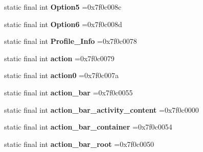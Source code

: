 \begin{DoxyCompactItemize}
\item 
\hypertarget{classcheck_1_1test_1_1_r_1_1id_ae06e762572fe73d9d3e5b03c27039f88}{}static final int {\bfseries Option5} =0x7f0c008c\label{classcheck_1_1test_1_1_r_1_1id_ae06e762572fe73d9d3e5b03c27039f88}

\item 
\hypertarget{classcheck_1_1test_1_1_r_1_1id_a2fe0abd6779994053230059068120cac}{}static final int {\bfseries Option6} =0x7f0c008d\label{classcheck_1_1test_1_1_r_1_1id_a2fe0abd6779994053230059068120cac}

\item 
\hypertarget{classcheck_1_1test_1_1_r_1_1id_a1cff9ad823689029201f1b845c877008}{}static final int {\bfseries Profile\+\_\+\+Info} =0x7f0c0078\label{classcheck_1_1test_1_1_r_1_1id_a1cff9ad823689029201f1b845c877008}

\item 
\hypertarget{classcheck_1_1test_1_1_r_1_1id_a3eeb730ea523c06cd1e7a0c4afc1eb1a}{}static final int {\bfseries action} =0x7f0c0079\label{classcheck_1_1test_1_1_r_1_1id_a3eeb730ea523c06cd1e7a0c4afc1eb1a}

\item 
\hypertarget{classcheck_1_1test_1_1_r_1_1id_a0b3c32e9f251a1db16f6bd38d1eb4b1f}{}static final int {\bfseries action0} =0x7f0c007a\label{classcheck_1_1test_1_1_r_1_1id_a0b3c32e9f251a1db16f6bd38d1eb4b1f}

\item 
\hypertarget{classcheck_1_1test_1_1_r_1_1id_ad06caad651634272f387d9ca08f1daaf}{}static final int {\bfseries action\+\_\+bar} =0x7f0c0055\label{classcheck_1_1test_1_1_r_1_1id_ad06caad651634272f387d9ca08f1daaf}

\item 
\hypertarget{classcheck_1_1test_1_1_r_1_1id_af65967f91bdfc834dd2d4ee025af07aa}{}static final int {\bfseries action\+\_\+bar\+\_\+activity\+\_\+content} =0x7f0c0000\label{classcheck_1_1test_1_1_r_1_1id_af65967f91bdfc834dd2d4ee025af07aa}

\item 
\hypertarget{classcheck_1_1test_1_1_r_1_1id_a459283ea26c658d6babacb9943b19681}{}static final int {\bfseries action\+\_\+bar\+\_\+container} =0x7f0c0054\label{classcheck_1_1test_1_1_r_1_1id_a459283ea26c658d6babacb9943b19681}

\item 
\hypertarget{classcheck_1_1test_1_1_r_1_1id_a51408397c0c114e76b4baaf04ce2cc93}{}static final int {\bfseries action\+\_\+bar\+\_\+root} =0x7f0c0050\label{classcheck_1_1test_1_1_r_1_1id_a51408397c0c114e76b4baaf04ce2cc93}


\end{DoxyCompactItemize}

